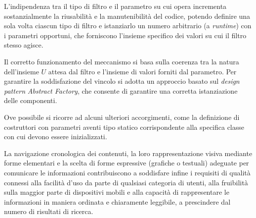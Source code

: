L'indipendenza tra il tipo di filtro e il parametro su cui opera incrementa sostanzialmente la riusabilità e la manutenibilità del codice, potendo definire una sola volta ciascun tipo di filtro e istanziarlo un numero arbitrario (a \textit{runtime}) con i parametri opportuni, che forniscono l'insieme specifico dei valori su cui il filtro stesso agisce.   

Il corretto funzionamento del meccanismo si basa sulla coerenza tra la natura dell'insieme $U$ attesa dal filtro e l'insieme di valori forniti dal parametro. Per garantire la soddisfazione del vincolo si adotta un approccio basato sul \textit{design pattern} \textit{Abstract Factory}, che consente di garantire una corretta istanziazione delle componenti.

Ove possibile si ricorre ad alcuni ulteriori accorgimenti, come la definizione di costruttori con parametri aventi tipo statico corrispondente alla specifica classe con cui devono essere inizializzati.

La navigazione cronologica dei contenuti, la loro rappresentazione visiva mediante forme elementari e la scelta di forme espressive (grafiche o testuali) adeguate per comunicare le informazioni contribuiscono a soddisfare infine i requisiti di qualità connessi alla facilità d'uso da parte di qualsiasi categoria di utenti, alla fruibilità sulla maggior parte di dispositivi mobili e alla capacità di rappresentare le informazioni in maniera ordinata e chiaramente leggibile, a prescindere dal numero di risultati di ricerca.